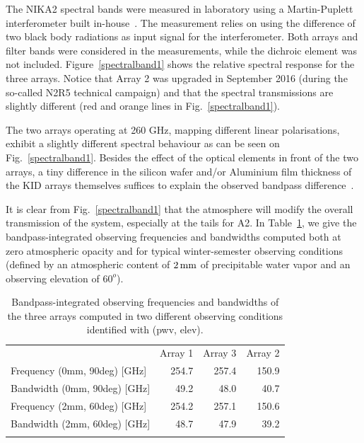 The NIKA2 spectral bands were measured in laboratory using a
Martin-Puplett interferometer built in-house~\citep{Durand2007_these}.
The measurement relies on using the difference of two black
body radiations as input signal for the interferometer. 
{\lp Both arrays and filter bands were considered in the
measurements, while the dichroic element was not included.}
Figure~\ref{spectralband1} shows the relative spectral response for
the three arrays. Notice that Array 2 was
upgraded in September 2016 (during the so-called N2R5 technical campaign) and that
the spectral transmissions are slightly different (red and orange lines in
Fig.~\ref{spectralband1}).

The two arrays operating at 260 GHz, mapping different linear polarisations,
exhibit a slightly different spectral behaviour as can be
seen on Fig.~\ref{spectralband1}. {\lp Besides the effect of the
optical elements in front of the two arrays, }a tiny
difference in the silicon wafer and/or Aluminium film
thickness of the KID arrays themselves suffices to explain the
observed bandpass difference~\citep{Adam2018}. 

It is clear from Fig.~\ref{spectralband1} that the atmosphere will
modify the overall transmission of the system, especially at the tails
for A2. In Table~\ref{tab:frequencies}, we give the bandpass-integrated
observing frequencies and bandwidths computed both at zero atmospheric
opacity and for typical winter-semester observing conditions
(defined by an atmospheric content of $2\,\rm{mm}$ of precipitable
water vapor and an observing elevation of $60^o$).

\begin{table}[!htbp]
  \caption[]{Bandpass-integrated observing frequencies and bandwidths
    of the three arrays computed in two different observing conditions
    identified with (pwv, elev).}
  \label{tab:frequencies}
  \centering    
  \begin{tabular}{lrrr}
    \hline\hline
    \noalign{\smallskip}
    & Array 1 & Array 3 & Array 2 \\
    \noalign{\smallskip}
    \hline
    \noalign{\smallskip}
    Frequency \small{(0mm, 90deg)} [GHz] & 254.7 & 257.4 &  150.9 \\
    Bandwidth \small{(0mm, 90deg)} [GHz] &  49.2 & 48.0  &   40.7 \\
    Frequency \small{(2mm, 60deg)} [GHz] & 254.2 & 257.1 &  150.6 \\
    Bandwidth \small{(2mm, 60deg)} [GHz] &  48.7 &  47.9 &    39.2 \\
    \noalign{\smallskip}
    \hline
  \end{tabular}
\end{table}

